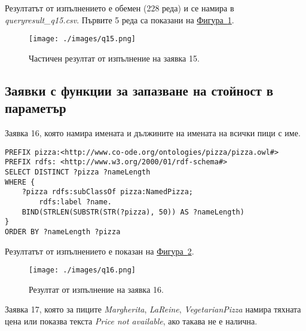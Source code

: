 \documentclass[12pt]{article}
\begin{document}
        Резултатът от изпълнението е обемен (228 реда) и се намира в \textit{query\-result\_q15.csv}. Първите 5 реда са показани на \hyperref[fig:q15]{Фигура~\ref*{fig:q15}}.

        \begin{center}
            \begin{figure}
            \centering
                \texttt{[image: ./images/q15.png]}
                \caption{Частичен резултат от изпълнение на заявка 15.}
                \label{fig:q15}
            \end{figure}
        \end{center}
                
\clearpage
\pagebreak

    \subsection{Заявки с функции за запазване на стойност в параметър}
        
        Заявка 16, която намира имената и дължините на имената на всички пици с име.

        \begin{lstlisting}[language=SPARQL,style=sparql]
PREFIX pizza:<http://www.co-ode.org/ontologies/pizza/pizza.owl#>
PREFIX rdfs: <http://www.w3.org/2000/01/rdf-schema#>
SELECT DISTINCT ?pizza ?nameLength
WHERE {
    ?pizza rdfs:subClassOf pizza:NamedPizza;
        rdfs:label ?name.
    BIND(STRLEN(SUBSTR(STR(?pizza), 50)) AS ?nameLength)
}
ORDER BY ?nameLength ?pizza\end{lstlisting}

        Резултатът от изпълнението е показан на \hyperref[fig:q16]{Фигура~\ref*{fig:q16}}.

        \begin{center}
            \begin{figure}
            \centering
                \texttt{[image: ./images/q16.png]}
                \caption{Резултат от изпълнение на заявка 16.}
                \label{fig:q16}
            \end{figure}
        \end{center}
                
\clearpage
\pagebreak

        Заявка 17, която за пиците \textit{Margherita}, \textit{LaReine},  \textit{VegetarianPizza} намира
 тяхната цена или показва текста \textit{Price not available}, ако такава не е налична.
 
\end{document}
